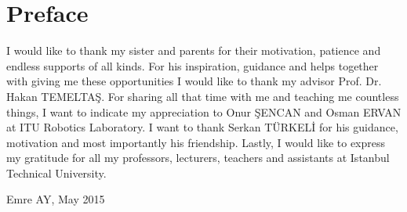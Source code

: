 \newcommand{\package}{\emph}

\chapter{Preface}
I would like to thank my sister and parents for their motivation, patience and endless supports of all kinds. For his inspiration, guidance and helps together with giving me these opportunities I would like to thank my advisor Prof. Dr. Hakan TEMELTAŞ. For sharing all that time with me and teaching me countless things, I want to indicate my appreciation to Onur ŞENCAN and Osman ERVAN at ITU Robotics Laboratory. I want to thank Serkan TÜRKELİ for his guidance, motivation and most importantly his friendship. Lastly, I would like to express my gratitude for all my professors, lecturers, teachers and assistants at Istanbul Technical University. 
\newline
\newline
\newline
\newline
\newline
\begin{flushright}
Emre AY, May 2015
\end{flushright}

